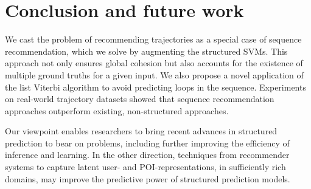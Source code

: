 
\section{Conclusion and future work}

We cast the problem of recommending trajectories as a special case of sequence recommendation,
which we solve by augmenting the structured SVMs.
This approach not only ensures global cohesion but also accounts for the existence of multiple ground truths for a given input.
We also propose a novel application of the list Viterbi algorithm to avoid predicting loops in the sequence.
%
%
Experiments on real-world trajectory datasets showed that
sequence recommendation approaches outperform existing, non-structured approaches.

Our viewpoint enables researchers to bring recent advances in structured prediction
to bear on {\trajrec} problems,
including further improving the efficiency of inference and learning.
In the other direction, techniques from recommender systems to capture latent
user- and POI-representations, in sufficiently rich domains, may
improve the predictive power of structured prediction models.


